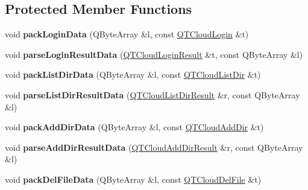 \subsection*{Protected Member Functions}
\begin{DoxyCompactItemize}
\item 
\mbox{\label{class_q_q_t_cloud_protocol_a3d557f580c31a6aa9fdabcb1d3446ddd}} 
void {\bfseries pack\+Login\+Data} (Q\+Byte\+Array \&l, const \mbox{\hyperlink{structtag_tank_login}{Q\+T\+Cloud\+Login}} \&t)
\item 
\mbox{\label{class_q_q_t_cloud_protocol_a1b4f73ae3580af211993e1b82ea951bb}} 
void {\bfseries parse\+Login\+Result\+Data} (\mbox{\hyperlink{structtag_tank_login_reuslt}{Q\+T\+Cloud\+Login\+Result}} \&t, const Q\+Byte\+Array \&l)
\item 
\mbox{\label{class_q_q_t_cloud_protocol_a9bbb0dcb710a1b07fa2374f98bda0b8f}} 
void {\bfseries pack\+List\+Dir\+Data} (Q\+Byte\+Array \&l, const \mbox{\hyperlink{structtag_q_t_cloud_list_dir}{Q\+T\+Cloud\+List\+Dir}} \&t)
\item 
\mbox{\label{class_q_q_t_cloud_protocol_a65b3c1cb93d42d56f9800eb622946ce7}} 
void {\bfseries parse\+List\+Dir\+Result\+Data} (\mbox{\hyperlink{structtag_q_t_cloud_list_dir_result}{Q\+T\+Cloud\+List\+Dir\+Result}} \&r, const Q\+Byte\+Array \&l)
\item 
\mbox{\label{class_q_q_t_cloud_protocol_a00ce662a2b1c2b201a0807b0e2e9c9d5}} 
void {\bfseries pack\+Add\+Dir\+Data} (Q\+Byte\+Array \&l, const \mbox{\hyperlink{structtag_tank_add_dir}{Q\+T\+Cloud\+Add\+Dir}} \&t)
\item 
\mbox{\label{class_q_q_t_cloud_protocol_a9a77bfcbd8d68d5dc1740a819e276bfe}} 
void {\bfseries parse\+Add\+Dir\+Result\+Data} (\mbox{\hyperlink{structtag_q_t_cloud_add_dir_result}{Q\+T\+Cloud\+Add\+Dir\+Result}} \&r, const Q\+Byte\+Array \&l)
\item 
\mbox{\label{class_q_q_t_cloud_protocol_a1aa6d737b76b3632be3456c660822988}} 
void {\bfseries pack\+Del\+File\+Data} (Q\+Byte\+Array \&l, const \mbox{\hyperlink{structtag_q_t_cloud_del_file}{Q\+T\+Cloud\+Del\+File}} \&t)

\end{DoxyCompactItemize}

